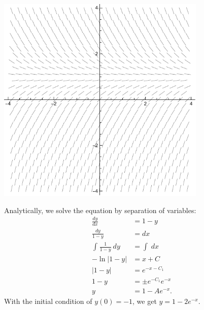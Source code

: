 \documentclass[10pt]{mypackage}
\begin{document}
\begin{example}
\begin{center}
    \includegraphics[width=10cm]{images/slopefieldnoexp.pdf}
  \end{center}
  Analytically, we solve the equation by separation of variables:
  \begin{align*}
    \frac{dy}{dx} &= 1-y\\
    \frac{dy}{1-y} &= dx\\
    \int_{}^{} \frac{1}{1-y}\:dy &= \int_{}^{} \:dx\\
    -\ln|1-y| &= x + C\\
    \left\vert 1-y \right\vert &= e^{-x-C_1}\\
    1-y &= \pm e^{-C_1}e^{-x}\\
    y &= 1-Ae^{-x}.
  \end{align*}
  With the initial condition of $y(0) = -1$, we get $y = 1-2e^{-x}$.


\end{example}
\end{document}
